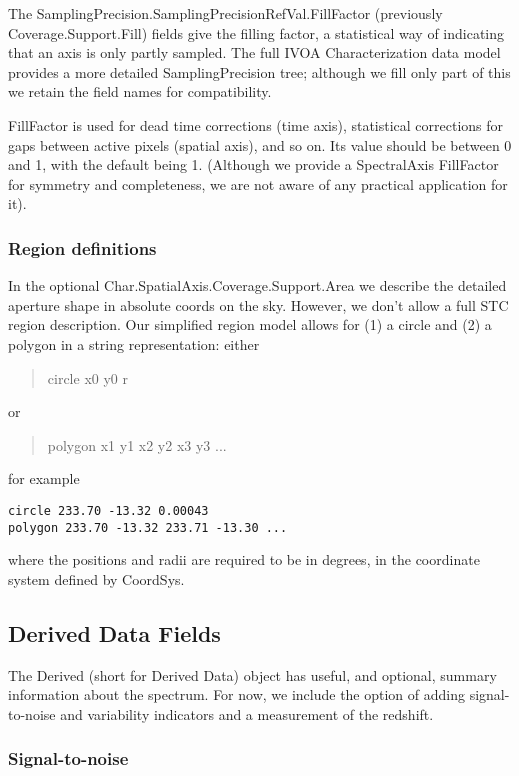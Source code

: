 \documentclass[11pt]{article}
\begin{document}
The SamplingPrecision.SamplingPrecisionRefVal.FillFactor
(previously Coverage.Support.Fill) fields give the filling factor, a statistical
way of indicating that an axis is only partly sampled. The full
IVOA Characterization data model provides a more detailed SamplingPrecision
tree; although we fill only part of this we retain the field names
for compatibility.

FillFactor is used 
for dead time corrections (time axis), statistical corrections for gaps
between active pixels (spatial axis),  and so on. Its value should be
between 0 and 1, with the default being 1. (Although we provide a
SpectralAxis FillFactor for symmetry and completeness, we are not
aware of any practical application for it).


\subsubsection{Region definitions}

In the optional Char.SpatialAxis.Coverage.Support.Area we describe the detailed aperture shape
in absolute coords on the sky. However, we don't allow a full STC region description.
Our simplified region model allows for 
(1) a circle and (2) a polygon in a string representation: either

\begin{quote}
circle x0 y0 r
\end{quote}
or
\begin{quote}
polygon x1 y1 x2 y2 x3 y3 ...
\end{quote}
for example
\begin{verbatim}
circle 233.70 -13.32 0.00043
polygon 233.70 -13.32 233.71 -13.30 ...
\end{verbatim}
where the positions and radii are required to be in degrees, in the coordinate
system defined by CoordSys.


\subsection{Derived Data Fields}

The Derived (short for Derived Data) object has useful, and optional, summary information
about the spectrum. For now, we include the option of adding
signal-to-noise and variability indicators and a measurement of the
redshift.

\subsubsection{Signal-to-noise}
\end{document}
